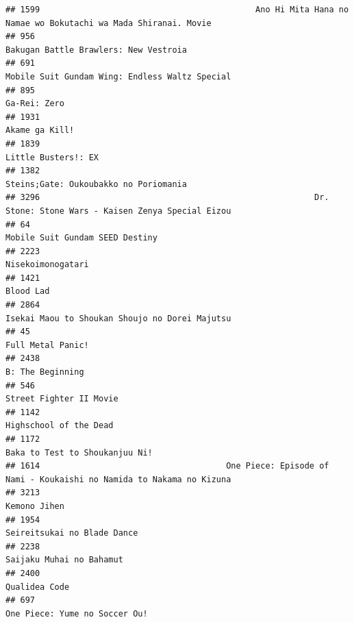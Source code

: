 \documentclass[
]{article}
\begin{document}
\begin{verbatim}
## 1599                                            Ano Hi Mita Hana no Namae wo Bokutachi wa Mada Shiranai. Movie
## 956                                                                      Bakugan Battle Brawlers: New Vestroia
## 691                                                             Mobile Suit Gundam Wing: Endless Waltz Special
## 895                                                                                               Ga-Rei: Zero
## 1931                                                                                            Akame ga Kill!
## 1839                                                                                       Little Busters!: EX
## 1382                                                                     Steins;Gate: Oukoubakko no Poriomania
## 3296                                                        Dr. Stone: Stone Wars - Kaisen Zenya Special Eizou
## 64                                                                             Mobile Suit Gundam SEED Destiny
## 2223                                                                                         Nisekoimonogatari
## 1421                                                                                                 Blood Lad
## 2864                                                            Isekai Maou to Shoukan Shoujo no Dorei Majutsu
## 45                                                                                           Full Metal Panic!
## 2438                                                                                          B: The Beginning
## 546                                                                                    Street Fighter II Movie
## 1142                                                                                    Highschool of the Dead
## 1172                                                                            Baka to Test to Shoukanjuu Ni!
## 1614                                      One Piece: Episode of Nami - Koukaishi no Namida to Nakama no Kizuna
## 3213                                                                                              Kemono Jihen
## 1954                                                                               Seireitsukai no Blade Dance
## 2238                                                                                  Saijaku Muhai no Bahamut
## 2400                                                                                             Qualidea Code
## 697                                                                              One Piece: Yume no Soccer Ou!

\end{verbatim}
\end{document}
